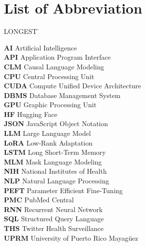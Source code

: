 

\chapter*{List of Abbreviation}

 \noindent
\vspace{-1.75\baselineskip}
  \begin{tabbing}
LONGEST \=  \kill %

\textbf{AI} \> Artificial Intelligence\\
\textbf{API} \> Application Program Interface\\
\textbf{CLM} \> Causal Language Modeling\\
\textbf{CPU} \> Central Processing Unit\\
\textbf{CUDA} \> Compute Unified Device Architecture\\
\textbf{DBMS} \> Database Management System\\
\textbf{GPU} \> Graphic Processing Unit\\
\textbf{HF} \> Hugging Face\\
\textbf{JSON} \> JavaScript Object Notation\\
\textbf{LLM} \> Large Language Model\\
\textbf{LoRA} \> Low-Rank Adaptation\\
\textbf{LSTM} \> Long Short-Term Memory\\
\textbf{MLM} \> Mask Language Modeling\\
\textbf{NIH} \> National Institutes of Health\\
\textbf{NLP} \> Natural Language Processing\\
\textbf{PEFT} \> Parameter Efficient Fine-Tuning\\
\textbf{PMC} \> PubMed Central\\
\textbf{RNN} \> Recurrent Neural Network\\
\textbf{SQL} \> Structured Query Language\\
\textbf{THS} \> Twitter Health Surveillance\\
\textbf{UPRM} \> University of Puerto Rico Mayag\"uez\\


\end{tabbing}